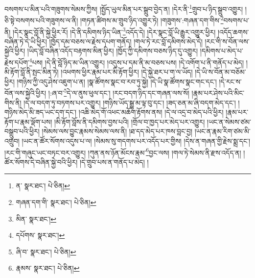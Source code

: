 བསགས་པ་མིན་པའི་གཟུགས་སེམས་ཀྱིས། །སྤྱོད་ཡུལ་མིན་པར་སྒྲུབ་བྱེད་ན། །དེར་ནི་\footnote{ན་  སྣར་ཐང་།  པེ་ཅིན། }གྲུབ་པ་ཉིད་སྒྲུབ་འགྱུར། །ཅི་སྟེ་བསགས་པའི་གཟུགས་ལ་ནི། །གཏན་ཚིགས་མ་གྲུབ་ཉིད་འགྱུར་ཏེ། །གཟུགས་:གཞན་དག་གིས་\footnote{གཞན་དག་གི་  སྣར་ཐང་།  པེ་ཅིན། }བསགས་པ་ནི། །དེར་སྣང་བློ་ནི་སྐྱེ་ཕྱིར་རོ། །དེ་ནི་དམིགས་ཉིད་ཡིན་\footnote{མིན་  སྣར་ཐང་། }འདོད་དེ། །དེར་སྣང་བློ་ཡི་རྒྱུར་འགྱུར་ཕྱིར། །འདོད་ཆགས་བཞིན་ཏེ་དེ་ཡི་ཕྱིར། །ཁྱོད་དམ་བཅས་ལ་རྗེས་དཔག་གནོད། །གལ་ཏེ་རང་བློ་དམིགས་མེད་དེ། །རང་གི་ས་བོན་ལས་སྐྱེའི་ཕྱིར། །ཡིད་བློ་བཞིན་འདོད་བརྟགས་མིན་ཕྱིར། །ཁྱོད་ཀྱི་དམིགས་བཅས་ཉིད་དུ་འགྱུར། །དམིགས་པ་མེད་པ་རྗེས་དཔོག་\footnote{དཔོགས་  སྣར་ཐང་། }པས། །དེ་ནི་བློ་ཉིད་མ་ཡིན་འགྱུར། །འདུས་པ་དམ་ནི་མ་བཅས་པས། །དེ་འགོག་པ་ནི་གནོད་པ་མེད། །མི་རྟོག་བློ་ནི་སྤང་མིན་ཏེ། །འཕགས་ཕྱིར་རྣམ་པར་མི་རྟོག་ཕྱིར། །དེ་སྐྱེ་ཐར་པ་ག་ལ་ཡོད། །དེ་ཡི་ས་བོན་མ་བཅོམ་ཕྱིར། །གཉིས་ཀྱི་འདུ་ཤེས་འཇུག་པ་ན། །སྣ་ཚོགས་སྣང་བ་རབ་ཏུ་སྐྱེ། །དེ་ཡི་སྣ་ཚོགས་སྣང་གང་དང་། །དེ་རང་ས་བོན་ལས་སྐྱེའི་ཕྱིར། །:ཞ་བ་\footnote{ཞི་བ་  སྣར་ཐང་།  པེ་ཅིན། }དེ་ལ་ནུས་ཕུལ་དང་། །རང་བདག་ཉིད་དང་གཞན་ལས་སོ། །རྣམ་པར་ཤེས་པའི་མིང་གིས་ནི། །དེ་ལ་བདག་ཏུ་བཏགས་པར་འགྱུར། །གཉིས་ཡོད་སྒྱུ་མ་ལྟ་བུ་དང་། །ཟད་ཅན་མ་ཞི་བདག་མེད་དང་། །གཉིས་མེད་མི་ཟད་ཡང་དག་དང་། །འཆི་མེད་གོ་འཕང་མཆོག་རྟོགས་ནས། །དེ་ལ་འདྲ་བ་མེད་པའི་ཕྱིར། །རྣམ་པར་རྟོག་པ་རྣམ་ལྡོག་པས། །མི་རྟོག་བློས་ནི་དམིགས་བྱས་པའི། །གྲོལ་བ་ཁྱད་པར་མེད་པར་འགྱུར། །ཡང་ན་སེམས་ཙམ་བསྒྲུབ་པའི་ཕྱིར། །སེམས་ལས་བྱུང་རྣམས་སེམས་ལས་ནི། །ཐ་དད་མེད་པར་ཁས་བླང་བྱ། །ཡང་ན་རྣམ་རིག་ཙམ་མི་འགྲུབ། །ཡང་ན་ཚོར་སོགས་འདུས་པ་ལ། །སེམས་སུ་གདགས་པར་འདོད་པར་གྱིས། །དེས་ན་གཞན་གྱི་རྗེས་སྨྲ་དང་། །རང་གི་གཞུང་ཡང་བཏང་བར་འགྱུར། །ཀུན་ནས་ཉོན་མོངས་རྣམ་\footnote{རྣམས་  སྣར་ཐང་།  པེ་ཅིན། }བྱང་ལས། །གལ་ཏེ་སེམས་ནི་རྫས་འདོད་ན། །ཚོར་སོགས་དེ་བཞིན་སྐྱེ་བའི་ཕྱིར། །དེ་གྲུབ་པས་ན་གནོད་པ་མེད། །
